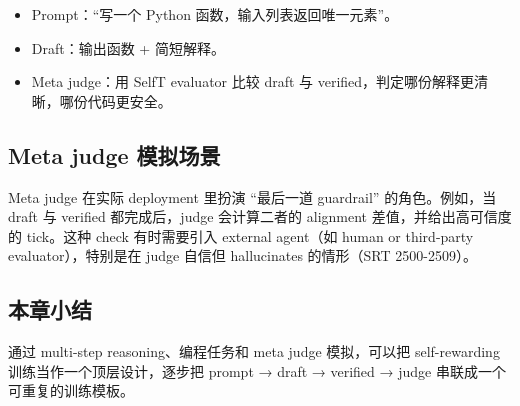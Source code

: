 \begin{itemize}
    \item Prompt：``写一个 Python 函数，输入列表返回唯一元素''。
    \item Draft：输出函数 + 简短解释。
    \item Meta judge：用 SelfT evaluator 比较 draft 与 verified，判定哪份解释更清晰，哪份代码更安全。
\end{itemize}

\subsection{Meta judge 模拟场景}
Meta judge 在实际 deployment 里扮演 ``最后一道 guardrail'' 的角色。例如，当 draft 与 verified 都完成后，judge 会计算二者的 alignment 差值，并给出高可信度的 tick。这种 check 有时需要引入 external agent（如 human or third-party evaluator），特别是在 judge 自信但 hallucinates 的情形（SRT 2500-2509）。

\subsection{本章小结}
通过 multi-step reasoning、编程任务和 meta judge 模拟，可以把 self-rewarding 训练当作一个顶层设计，逐步把 prompt → draft → verified → judge 串联成一个可重复的训练模板。

